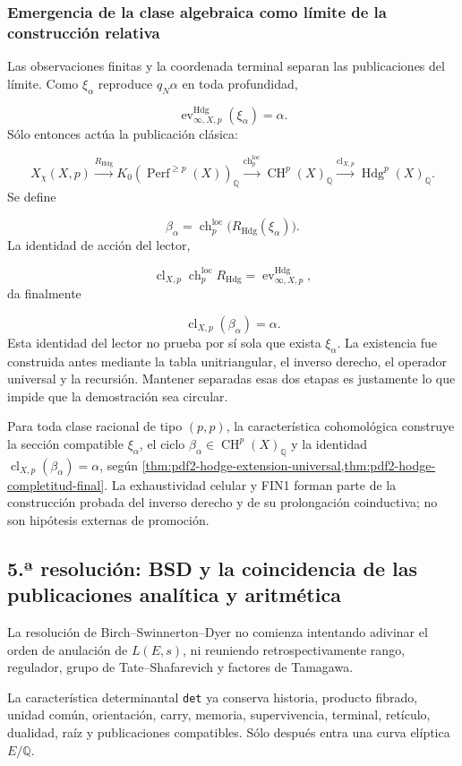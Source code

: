\subsubsection{Emergencia de la clase algebraica como límite de la construcción relativa}
Las observaciones finitas y la coordenada terminal separan las publicaciones del límite. Como \(\xi_\alpha\) reproduce \(q_N\alpha\) en toda profundidad,\par
\[
\operatorname{ev}_{\infty,X,p}^{\mathrm{Hdg}}
(\xi_\alpha)
=
\alpha.
\]
Sólo entonces actúa la publicación clásica:\par
\[
X_\chi(X,p)
\xrightarrow{R_{\mathrm{Hdg}}}
K_0\!\left(
\operatorname{Perf}^{\ge p}(X)
\right)_{\mathbb Q}
\xrightarrow{\operatorname{ch}^{\mathrm{loc}}_p}
\operatorname{CH}^{p}(X)_{\mathbb Q}
\xrightarrow{\operatorname{cl}_{X,p}}
\operatorname{Hdg}^{p}(X)_{\mathbb Q}.
\]
Se define\par
\[
\beta_\alpha
=
\operatorname{ch}^{\mathrm{loc}}_p
\bigl(R_{\mathrm{Hdg}}(\xi_\alpha)\bigr).
\]
La identidad de acción del lector,\par
\[
\operatorname{cl}_{X,p}
\operatorname{ch}^{\mathrm{loc}}_p
R_{\mathrm{Hdg}}
=
\operatorname{ev}_{\infty,X,p}^{\mathrm{Hdg}},
\]
da finalmente\par
\[
\operatorname{cl}_{X,p}(\beta_\alpha)
=
\alpha.
\]
Esta identidad del lector no prueba por sí sola que exista \(\xi_\alpha\). La existencia fue construida antes mediante la tabla unitriangular, el inverso derecho, el operador universal y la recursión. Mantener separadas esas dos etapas es justamente lo que impide que la demostración sea circular.\par
Para toda clase racional de tipo \((p,p)\), la característica cohomológica
construye la sección compatible \(\xi_\alpha\), el ciclo
\(\beta_\alpha\in\operatorname{CH}^p(X)_{\mathbb Q}\) y la identidad
\(\operatorname{cl}_{X,p}(\beta_\alpha)=\alpha\), según
\cref{thm:pdf2-hodge-extension-universal,thm:pdf2-hodge-completitud-final}.
La exhaustividad celular y FIN1 forman parte de la construcción probada del
inverso derecho y de su prolongación coinductiva; no son hipótesis externas de
promoción.\par
{}
\subsection{5.ª resolución: BSD y la coincidencia de las publicaciones analítica y aritmética}
La resolución de Birch–Swinnerton–Dyer no comienza intentando adivinar el orden de anulación de \(L(E,s)\), ni reuniendo retrospectivamente rango, regulador, grupo de Tate–Shafarevich y factores de Tamagawa.\par
La característica determinantal \texttt{det} ya conserva historia, producto fibrado, unidad común, orientación, carry, memoria, supervivencia, terminal, retículo, dualidad, raíz y publicaciones compatibles. Sólo después entra una curva elíptica \(E/\mathbb Q\).\par
{}
